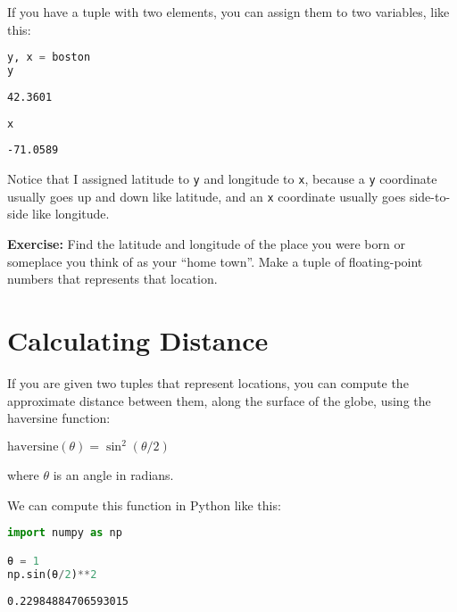 If you have a tuple with two elements, you can assign them to two
variables, like this:

\begin{lstlisting}[language=Python,style=source]
y, x = boston
y
\end{lstlisting}

\begin{lstlisting}[style=output]
42.3601
\end{lstlisting}

\begin{lstlisting}[language=Python,style=source]
x
\end{lstlisting}

\begin{lstlisting}[style=output]
-71.0589
\end{lstlisting}

Notice that I assigned latitude to \passthrough{\lstinline!y!} and
longitude to \passthrough{\lstinline!x!}, because a
\passthrough{\lstinline!y!} coordinate usually goes up and down like
latitude, and an \passthrough{\lstinline!x!} coordinate usually goes
side-to-side like longitude.

\textbf{Exercise:} Find the latitude and longitude of the place you were
born or someplace you think of as your ``home town''. Make a tuple of
floating-point numbers that represents that location.

\section{Calculating Distance}\label{calculating-distance}

If you are given two tuples that represent locations, you can compute
the approximate distance between them, along the surface of the globe,
using the haversine function:

\(\mathrm{haversine}(\theta)=\sin^2(\theta/2)\)

where \(\theta\) is an angle in radians.

\pagebreak

We can compute this function in
Python like this:

\begin{lstlisting}[language=Python,style=source]
import numpy as np

θ = 1
np.sin(θ/2)**2
\end{lstlisting}

\begin{lstlisting}[style=output]
0.22984884706593015
\end{lstlisting}


